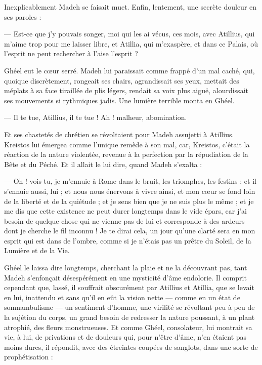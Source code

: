 \documentclass[a4paper, 11pt, oneside, polutonikogreek, french]{article}
\begin{document}
Inexplicablement Madeh se faisait muet. Enfin, lentement, une secrète douleur en ses paroles :

--- Est-ce que j'y pouvais songer, moi qui les ai vécus, ces mois, avec Atillius, qui m'aime trop pour me laisser libre, et Atillia, qui m'exaspère, et dans ce Palais, où l'esprit ne peut rechercher à l'aise l'esprit ?

Ghéel eut le cœur serré. Madeh lui paraissait comme frappé d'un mal caché, qui, quoique discrètement, rongeait ses chairs, agrandissait ses yeux, mettait des méplats à sa face tiraillée de plis légers, rendait sa voix plus aiguë, alourdissait ses mouvements si rythmiques jadis. Une lumière terrible monta en Ghéel.

--- Il te tue, Atillius, il te tue ! Ah ! malheur, abomination.

Et ses chastetés de chrétien se révoltaient pour Madeh assujetti à Atillius. Kreistos lui émergea comme l'unique remède à son mal, car, Kreistos, c'était la réaction de la nature violentée, revenue à la perfection par la répudiation de la Bête et du Péché. Et il allait le lui dire, quand Madeh s'exalta :

--- Oh ! vois-tu, je m'ennuie à Rome dans le bruit, les triomphes, les festins ; et il s'ennuie aussi, lui ; et nous nous énervons à vivre ainsi, et mon cœur se fond loin de la liberté et de la quiétude ; et je sens bien que je ne suis plus le même ; et je me dis que cette existence ne peut durer longtemps dans le vide épars, car j'ai besoin de quelque chose qui ne vienne pas de lui et corresponde à des ardeurs dont je cherche le fil inconnu ! Je te dirai cela, un jour qu'une clarté sera en mon esprit qui est dans de l'ombre, comme si je n'étais pas un prêtre du Soleil, de la Lumière et de la Vie.

Ghéel le laissa dire longtemps, cherchant la plaie et ne la découvrant pas, tant Madeh s'enfonçait désespérément en une mysticité d'âme endolorie. Il comprit cependant que, lassé, il souffrait obscurément par Atillius et Atillia, que se levait en lui, inattendu et sans qu'il en eût la vision nette --- comme en un état de somnambulisme --- un sentiment d'homme, une virilité se révoltant peu à peu de la sujétion du corps, un grand besoin de redresser la nature poussant, à un plant atrophié, des fleurs monstrueuses. Et comme Ghéel, consolateur, lui montrait sa vie, à lui, de privations et de douleurs qui, pour n'être d'âme, n'en étaient pas moins dures, il répondit, avec des étreintes coupées de sanglots, dans une sorte de prophétisation :
\end{document}
